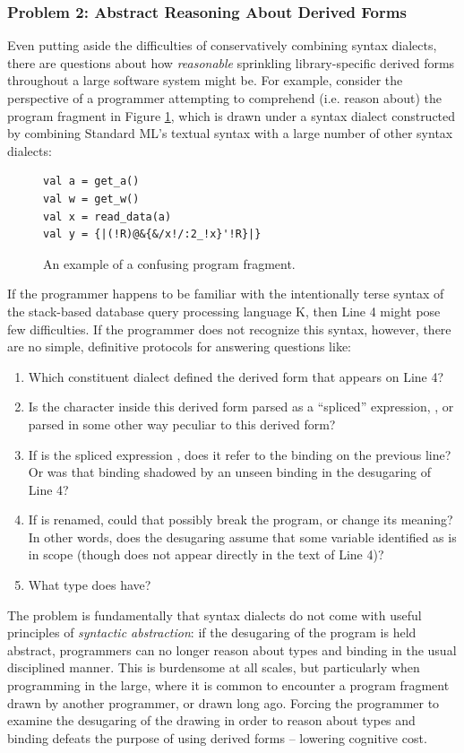 \subsubsection{Problem 2: Abstract Reasoning About Derived Forms}\label{sec:abs-reasoning-intro}
Even putting aside the difficulties of conservatively combining syntax dialects, there are questions about how \emph{reasonable}  sprinkling library-specific derived forms throughout a large software system might be. 
For example, consider the perspective of a programmer attempting to comprehend (i.e. reason about) the program fragment in Figure \ref{fig:K-dialect}, which is drawn under a syntax dialect constructed by combining Standard ML's textual syntax with a large number of other syntax dialects:

\begin{figure}
\begin{lstlisting}
val a = get_a()
val w = get_w()
val x = read_data(a)
val y = {|(!R)@&{&/x!/:2_!x}'!R}|}
\end{lstlisting}
\caption{An example of a confusing program fragment.}
\label{fig:K-dialect}
\end{figure}

If the programmer happens to be familiar with the intentionally terse syntax of the stack-based database query processing language K, then Line 4 might pose few difficulties. If the programmer does not recognize this syntax, however, there are no simple, definitive protocols for answering questions like:

\begin{enumerate}
\item Which constituent dialect defined the derived form that appears on Line 4?
\item Is the character  inside this derived form parsed as a ``spliced'' expression, , or parsed in some other way peculiar to this derived form?
\item If  is the spliced expression , does it refer to the binding on the previous line? Or was that binding shadowed by an unseen binding in the desugaring of Line 4?
\item If  is renamed, could that possibly break the program, or change its meaning? In other words, does the desugaring  assume that some variable identified as  is in scope (though  does not appear directly in the text of Line 4)?
\item What type does  have?
\end{enumerate}
The problem is fundamentally that syntax dialects do not come with useful principles of \emph{syntactic abstraction}: if the desugaring of the program is held abstract, programmers can no longer reason about types and binding in the usual disciplined manner. This is burdensome at all scales, but particularly when programming in the large, where it is common to encounter a program fragment drawn by another programmer, or drawn  long ago. Forcing the programmer to examine the desugaring of the drawing in order to reason about types and binding defeats the purpose of using derived forms -- lowering cognitive cost.


